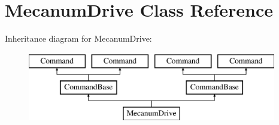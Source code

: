 \hypertarget{class_mecanum_drive}{}\section{Mecanum\+Drive Class Reference}
\label{class_mecanum_drive}
Inheritance diagram for Mecanum\+Drive\+:\begin{figure}[H]
\begin{center}
\leavevmode
\includegraphics[height=3.000000cm]{class_mecanum_drive}
\end{center}
\end{figure}
